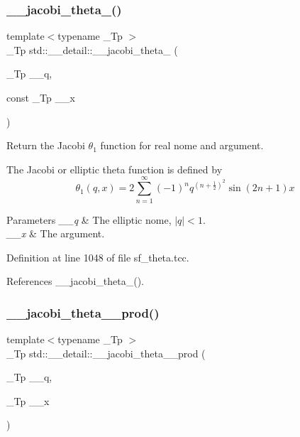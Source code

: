 \subsubsection{\texorpdfstring{\+\_\+\+\_\+jacobi\+\_\+theta\+\_()}{\_\_jacobi\_theta\_1()}\hspace{0.1cm}{\footnotesize\ttfamily [2/2]}}
{\footnotesize\ttfamily template$<$typename \+\_\+\+Tp $>$ \\
\+\_\+\+Tp std\+::\+\_\+\+\_\+detail\+::\+\_\+\+\_\+jacobi\+\_\+theta\+\_ (\begin{DoxyParamCaption}\item[{\+\_\+\+Tp}]{\+\_\+\+\_\+q,  }\item[{const \+\_\+\+Tp}]{\+\_\+\+\_\+x }\end{DoxyParamCaption})}

Return the Jacobi $ \theta_1 $ function for real nome and argument.

The Jacobi or elliptic theta function is defined by \[ \theta_1(q,x) = 2\sum_{n=1}^{\infty}(-1)^n q^{(n+\frac{1}{2})^2}\sin{(2n+1)x} \]


\begin{DoxyParams}{Parameters}
{\em \+\_\+\+\_\+q} & The elliptic nome, $ |q| < 1 $. \\
\hline
{\em \+\_\+\+\_\+x} & The argument. \\
\hline
\end{DoxyParams}


Definition at line 1048 of file sf\+\_\+theta.\+tcc.



References \+\_\+\+\_\+jacobi\+\_\+theta\+\_().

\mbox{\label{namespacestd_1_1____detail_a6283a61803d2bc02eebf1d1a12b1bb52}} 
\subsubsection{\texorpdfstring{\+\_\+\+\_\+jacobi\+\_\+theta\+\_\+\_\+prod()}{\_\_jacobi\_theta\_1\_prod()}}
{\footnotesize\ttfamily template$<$typename \+\_\+\+Tp $>$ \\
\+\_\+\+Tp std\+::\+\_\+\+\_\+detail\+::\+\_\+\+\_\+jacobi\+\_\+theta\+\_\+\_\+prod (\begin{DoxyParamCaption}\item[{\+\_\+\+Tp}]{\+\_\+\+\_\+q,  }\item[{\+\_\+\+Tp}]{\+\_\+\+\_\+x }\end{DoxyParamCaption})}

